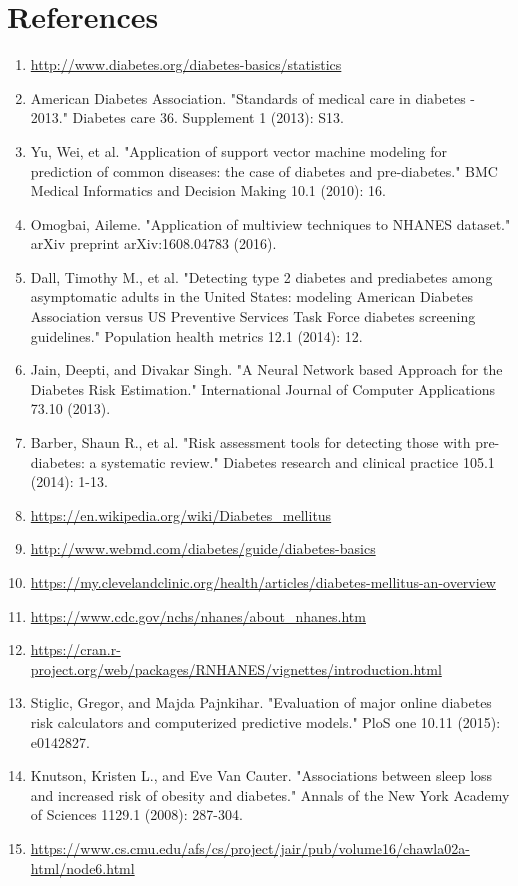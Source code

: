 \documentclass[twoside,11pt]{article}
\begin{document}
\section{References}
\begin{enumerate}
\item \url{http://www.diabetes.org/diabetes-basics/statistics}
\item American Diabetes Association. "Standards of medical care in diabetes - 2013." Diabetes care 36. Supplement 1 (2013): S13.
\item Yu, Wei, et al. "Application of support vector machine modeling for prediction of common diseases: the case of diabetes and pre-diabetes." BMC Medical Informatics and Decision Making 10.1 (2010): 16.
\item Omogbai, Aileme. "Application of multiview techniques to NHANES dataset." arXiv preprint arXiv:1608.04783 (2016).
\item Dall, Timothy M., et al. "Detecting type 2 diabetes and prediabetes among asymptomatic adults in the United States: modeling American Diabetes Association versus US Preventive Services Task Force diabetes screening guidelines." Population health metrics 12.1 (2014): 12.
\item Jain, Deepti, and Divakar Singh. "A Neural Network based Approach for the Diabetes Risk Estimation." International Journal of Computer Applications 73.10 (2013).
\item Barber, Shaun R., et al. "Risk assessment tools for detecting those with pre-diabetes: a systematic review." Diabetes research and clinical practice 105.1 (2014): 1-13.
\item \url{https://en.wikipedia.org/wiki/Diabetes_mellitus}
\item \url{http://www.webmd.com/diabetes/guide/diabetes-basics}
\item \url{https://my.clevelandclinic.org/health/articles/diabetes-mellitus-an-overview}
\item \url{https://www.cdc.gov/nchs/nhanes/about_nhanes.htm}
\item \url{https://cran.r-project.org/web/packages/RNHANES/vignettes/introduction.html}
\item Stiglic, Gregor, and Majda Pajnkihar. "Evaluation of major online diabetes risk calculators and computerized predictive models." PloS one 10.11 (2015): e0142827.
\item Knutson, Kristen L., and Eve Van Cauter. "Associations between sleep loss and increased risk of obesity and diabetes." Annals of the New York Academy of Sciences 1129.1 (2008): 287-304.
\item \url{https://www.cs.cmu.edu/afs/cs/project/jair/pub/volume16/chawla02a-html/node6.html}
\end{enumerate}
\end{document}
